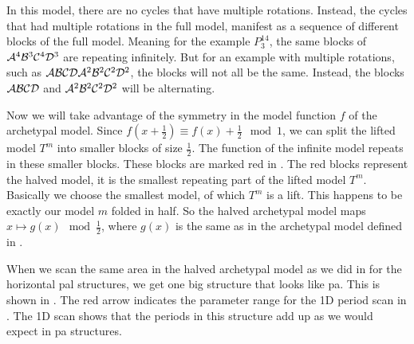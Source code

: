 In this model, there are no cycles that have multiple rotations.
Instead, the cycles that had multiple rotations in the full model, manifest as a sequence of different blocks of the full model.
Meaning for the example $P^{14}_3$, the same blocks of $\mathcal{A}^4\mathcal{B}^3\mathcal{C}^4\mathcal{D}^3$ are repeating infinitely.
But for an example with multiple rotations, such as $\mathcal{A}\mathcal{B}\mathcal{C}\mathcal{D}\mathcal{A}^2\mathcal{B}^2\mathcal{C}^2\mathcal{D}^2$, the blocks will not all be the same.
Instead, the blocks $\mathcal{A}\mathcal{B}\mathcal{C}\mathcal{D}$ and $\mathcal{A}^2\mathcal{B}^2\mathcal{C}^2\mathcal{D}^2$ will be alternating.

Now we will take advantage of the symmetry in the model function $f$ of the archetypal model.
Since $f(x + \frac{1}{2}) \equiv f(x) + \frac{1}{2} \mod 1$, we can split the lifted model $T^m$ into smaller blocks of size $\frac{1}{2}$.
The function of the infinite model repeats in these smaller blocks.
These blocks are marked red in .
The red blocks represent the halved model, it is the smallest repeating part of the lifted model $T^m$.
Basically we choose the smallest model, of which $T^m$ is a lift.
This happens to be exactly our model $m$ folded in half.
So the halved archetypal model maps $x \mapsto g(x) \mod \frac{1}{2}$, where $g(x)$ is the same as in the archetypal model defined in .

When we scan the same area in the halved archetypal model as we did in  for the horizontal \gls{pal} structures, we get one big structure that looks like \gls{pa}.
This is shown in .
The red arrow indicates the parameter range for the 1D period scan in .
The 1D scan shows that the periods in this structure add up as we would expect in \gls{pa} structures.

